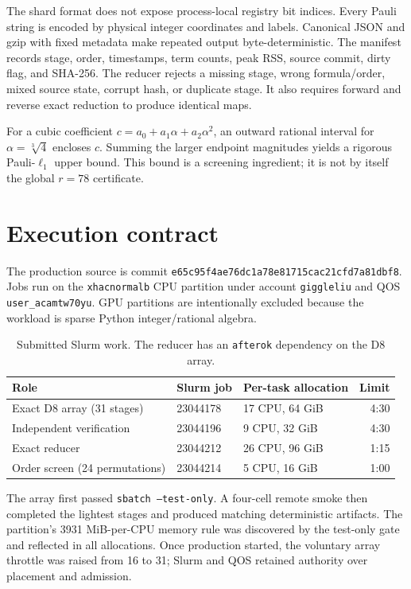\documentclass[10pt]{article}
\begin{document}
The shard format does not expose process-local registry bit indices.  Every
Pauli string is encoded by physical integer coordinates and labels.  Canonical
JSON and gzip with fixed metadata make repeated output byte-deterministic.
The manifest records stage, order, timestamps, term counts, peak RSS, source
commit, dirty flag, and SHA-256.  The reducer rejects a missing stage, wrong
formula/order, mixed source state, corrupt hash, or duplicate stage.  It also
requires forward and reverse exact reduction to produce identical maps.

For a cubic coefficient $c=a_0+a_1\alpha+a_2\alpha^2$, an outward rational
interval for $\alpha=\sqrt[3]{4}$ encloses $c$.  Summing the larger endpoint
magnitudes yields a rigorous Pauli-$\ell_1$ upper bound.  This bound is a
screening ingredient; it is not by itself the global $r=78$ certificate.

\section{Execution contract}

The production source is commit
\texttt{e65c95f4ae76dc1a78e81715cac21cfd7a81dbf8}.  Jobs run on the
\texttt{xhacnormalb} CPU partition under account \texttt{giggleliu} and QOS
\texttt{user\_acamtw70yu}.  GPU partitions are intentionally excluded because
the workload is sparse Python integer/rational algebra.

\begin{table}[h]
\centering
\begin{tabular}{@{}lllr@{}}
\toprule
Role & Slurm job & Per-task allocation & Limit \\
\midrule
Exact D8 array (31 stages) & 23044178 & 17 CPU, 64 GiB & 4:30 \\
Independent verification & 23044196 & 9 CPU, 32 GiB & 4:30 \\
Exact reducer & 23044212 & 26 CPU, 96 GiB & 1:15 \\
Order screen (24 permutations) & 23044214 & 5 CPU, 16 GiB & 1:00 \\
\bottomrule
\end{tabular}
\caption{Submitted Slurm work.  The reducer has an \texttt{afterok}
dependency on the D8 array.}
\end{table}

The array first passed \texttt{sbatch --test-only}.  A four-cell remote smoke
then completed the lightest stages and produced matching deterministic
artifacts.  The partition's 3931 MiB-per-CPU memory rule was discovered by the
test-only gate and reflected in all allocations.  Once production started,
the voluntary array throttle was raised from 16 to 31; Slurm and QOS retained
authority over placement and admission.
\end{document}
